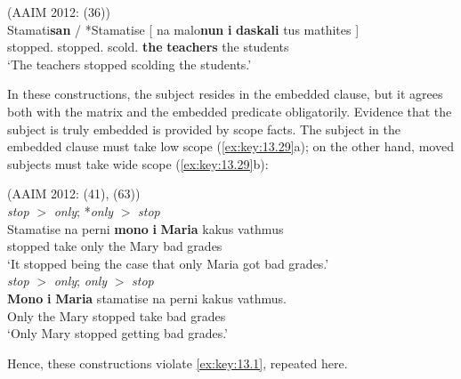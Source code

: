 \documentclass[output=paper]{langsci/langscibook}
\begin{document}
\ea%
\label{ex:key:13.28} (AAIM 2012: (36))\\
    \gll  Stamati\textbf{san} / *Stamatise [ na malo\textbf{nun} \textbf{i} \textbf{daskali} tus mathites ] \\
        stopped.\textbf{\Tpl} {}  \hphantom{*}stopped.\Tsg{} {} \Sbjv{} scold.\textbf{\Tpl} \textbf{the} \textbf{teachers}  the students\\
    \glt  ‘The teachers stopped scolding the students.’
\z

In these constructions, the subject resides in the embedded clause, but it
agrees both with the matrix and the embedded predicate obligatorily. Evidence
that the subject is truly embedded is provided by scope facts. The subject in
the embedded clause must take low scope (\ref{ex:key:13.29}a); on the other hand,
moved subjects must take wide scope (\ref{ex:key:13.29}b):

\ea%
    \label{ex:key:13.29} (AAIM 2012: (41), (63))\\
	\ea \emph{stop} $>$ \emph{only}; *\emph{only} $>$ \emph{stop}\\
	\gll  Stamatise na perni  \textbf{mono} \textbf{i} \textbf{Maria}  kakus vathmus\\
	    stopped \Sbjv{} take only the Mary bad grades\\
	\glt ‘It stopped being the case that only Maria got bad grades.’\\
	\ex \makebox[0pt][r]{*}\emph{stop} $>$ \emph{only}; \emph{only} $>$ \emph{stop}\\
	\gll  \textbf{Mono} \textbf{i} \textbf{Maria} stamatise na perni kakus vathmus.\\
	    Only the Mary stopped \Sbjv{} take bad grades\\
	\glt   ‘Only Mary stopped getting bad grades.’
    \z
\z

Hence, these constructions violate \eqref{ex:key:13.1}, repeated here.
\end{document}

